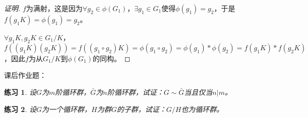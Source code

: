 \documentclass{article}
\newtheorem{Exercise}{练习}
\begin{document}
\begin{CJK*}{UTF8}{gbsn}
\begin{proof}[证明]
$f$为满射，这是因为$\forall g_2 \in \phi(G_1)$，$\exists g_1\in G_1$使得$\phi(g_1)=g_2$，于是$f(g_1K)=\phi(g_1)=g_2$。

$\forall g_1K,g_2K\in G_1/K$，$f((g_1K)(g_2K))=f((g_1\circ g_2)K)=\phi(g_1\circ g_2)=\phi(g_1)*\phi(g_2)=f(g_1K)*f(g_2K)$，因此$f$为从$G_1/K$到$\phi(G_1)$的同构。
\end{proof}
课后作业题：
\begin{Exercise}
设$G$为$m$阶循环群，$\bar{G}$为$n$阶循环群，试证：$G \sim \bar{G}$当且仅当$n | m$。
\end{Exercise}

\begin{Exercise}
设$G$为一个循环群，$H$为群$G$的子群，试证：$G/H$也为循环群。
\end{Exercise}
\end{CJK*}
\end{document}
